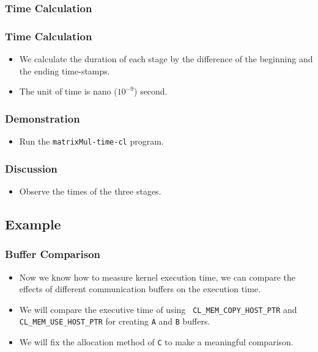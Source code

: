 \documentclass{beamer}
\begin{document}
\begin{frame}
  \frametitle{Time Calculation}
\end{frame}

\begin{frame}
  \frametitle{Time Calculation}
  \begin{itemize}
  \item We calculate the duration of each stage by the difference of
    the beginning and the ending time-stamps.
  \item The unit of time is nano ($10^{-9}$) second. 
  \end{itemize}
\end{frame}

\begin{frame}
\end{frame}

\begin{frame}
  \frametitle{Demonstration}
  \begin{itemize}
    \item Run the {\tt matrixMul-time-cl} program.
  \end{itemize}
\end{frame}

\begin{frame}
  \frametitle{Discussion}
  \begin{itemize}
  \item Observe the times of the three stages.
  \end{itemize}
\end{frame}

\subsection{Example}

\begin{frame}
  \frametitle{Buffer Comparison}
  \begin{itemize}
    \item Now we know how to measure kernel execution time, we can
      compare the effects of different communication buffers on the
      execution time.
    \item We will compare the executive time of using {\tt
      CL\_MEM\_COPY\_HOST\_PTR} and {\tt CL\_MEM\_USE\_HOST\_PTR} for
      creating {\tt A} and {\tt B} buffers.
    \item We will fix the allocation method of {\tt C} to make a
      meaningful comparison.
  \end{itemize}
\end{frame}
\end{document}
